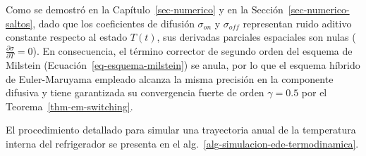 \documentclass[
  spanish,
  letterpaper,
  DIV=11,
  numbers=noendperiod]{scrreprt}
\theoremstyle{plain}
\theoremstyle{plain}
\theoremstyle{plain}
\theoremstyle{definition}
\theoremstyle{remark}
\begin{document}
Como se demostró en la Capítulo~\ref{sec-numerico} y en la
Sección~\ref{sec-numerico-saltos}, dado que los coeficientes de difusión
\(\sigma_{on}\) y \(\sigma_{off}\) representan ruido aditivo constante
respecto al estado \(T(t)\), sus derivadas parciales espaciales son
nulas (\(\frac{\partial \sigma}{\partial T} = 0\)). En consecuencia, el
término corrector de segundo orden del esquema de Milstein
(Ecuación~\ref{eq-esquema-milstein}) se anula, por lo que el esquema
híbrido de Euler-Maruyama empleado alcanza la misma precisión en la
componente difusiva y tiene garantizada su convergencia fuerte de orden
\(\gamma = 0.5\) por el Teorema~\ref{thm-em-switching}.

El procedimiento detallado para simular una trayectoria anual de la
temperatura interna del refrigerador se presenta en el
alg.~\ref{alg-simulacion-ede-termodinamica}.
\end{document}
